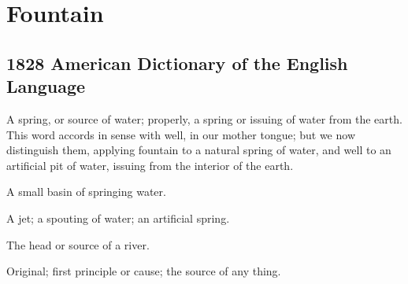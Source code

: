 \section{Fountain}
	\label{FOUNTAIN}
	

\subsection{1828 American Dictionary of the English Language} %
	\label{FOUNTAIN-1828}

	\begin{compactitem}
		\item[1]  A spring, or source of water; properly, a spring or issuing of water from the earth. This word accords in sense with well, in our mother tongue; but we now distinguish them, applying fountain to a natural spring of water, and well to an artificial pit of water, issuing from the interior of the earth.
		\item[2] A small basin of springing water.
		\item[3] A jet; a spouting of water; an artificial spring.
		\item[4] The head or source of a river.
		\item[5] Original; first principle or cause; the source of any thing.
	\end{compactitem}




